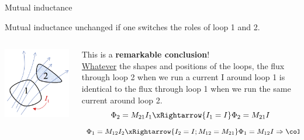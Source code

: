 %
%
%

\begin{frame}{Mutual inductance}

Mutual inductance unchanged if one switches the roles of loop 1 and 2.\\

\vspace{0.2cm}

\begin{columns}
  \begin{column}{0.30\textwidth}
    \begin{center}
       \includegraphics[width=0.99\textwidth]{./images/schematics/mutual_inductance_1.png}\\
     \end{center}
  \end{column}
  \begin{column}{0.70\textwidth}
  {\small
         This is a {\bf remarkable conclusion}!\\
         \vspace{0.2cm}
         \underline{Whatever} the shapes and positions of the loops,
         the flux through loop 2 when we run a current I around loop 1 is
         identical to the flux through loop 1 when we run the same current around loop 2.
         \begin{equation*}
               \Phi_2 = M_{21}  I_1 \xRightarrow{I_1 = I}  \Phi_2 = M_{21}  I
         \end{equation*}
         \begin{equation*}
               \Phi_1 = M_{12}  I_2 \xRightarrow{I_2 = I; M_{12} = M_{21}}  \Phi_1 = M_{12}  I \Rightarrow
               {\color{magenta}
                     \Phi_1 = \Phi_2
               }
         \end{equation*}
  }
  \end{column}
\end{columns}


\end{frame}
